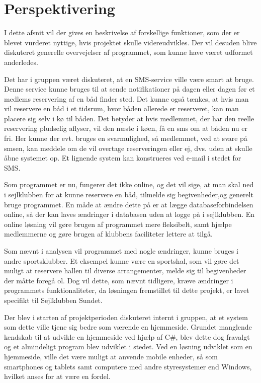 \chapter{Perspektivering}

I dette afsnit vil der gives en beskrivelse af forskellige funktioner, som der er blevet vurderet nyttige, hvis projektet skulle videreudvikles. 
Der vil desuden blive diskuteret generelle overvejelser af programmet, som kunne have været udformet anderledes. 

Det har i gruppen været diskuteret, at en SMS-service ville være smart at bruge. 
Denne service kunne bruges til at sende notifikationer på dagen eller dagen før et medlems reservering af en båd finder sted. 
Det kunne også tænkes, at hvis man vil reservere en båd i et tidsrum, hvor båden allerede er reserveret, kan man placere sig selv i kø til båden.
Det betyder at hvis medlemmet, der har den reelle reservering pludselig aflyser, vil den næste i køen, få en sms om at båden nu er fri.
Her kunne der evt. bruges en svarmulighed, så medlemmet, ved at svare på smsen, kan meddele om de vil overtage reserveringen eller ej, dvs. uden at skulle åbne systemet op. 
Et lignende system kan konstrueres ved e-mail i stedet for SMS.

Som programmet er nu, fungerer det ikke online, og det vil sige, at man skal ned i sejlklubben for at kunne reservere en båd, tilmelde sig begivenheder,og generelt bruge programmet. 
En måde at ændre dette på er at lægge databaseforbindelsen online, så der kan laves ændringer i databasen uden at logge på i sejlklubben. 
En online løsning vil gøre brugen af programmet mere fleksibelt, samt hjælpe medlemmerne og gøre brugen af klubbens faciliteter lettere at tilgå.

Som nævnt i analysen vil programmet med nogle ændringer, kunne bruges i andre sportsklubber. 
Et eksempel kunne være en sportshal, som vil gøre det muligt at reservere hallen til diverse arrangementer, melde sig til begivenheder der måtte foregå ol. 
Dog vil dette, som nævnt tidligere, kræve ændringer i programmets funktionaliteter, da løsningen fremstillet til dette projekt, er lavet specifikt til Sejlklubben Sundet.

Der blev i starten af projektperioden diskuteret internt i gruppen, at et system som dette ville tjene sig bedre som værende en hjemmeside.
Grundet manglende kendskab til at udvikle en hjemmeside ved hjælp af C\#, blev dette dog fravalgt og et almindeligt program blev udviklet i stedet. 
Ved en løsning udviklet som en hjemmeside, ville det være muligt at anvende mobile enheder, så som smartphones og tablets samt computere med andre styresystemer end Windows, hvilket anses for at være en fordel.
